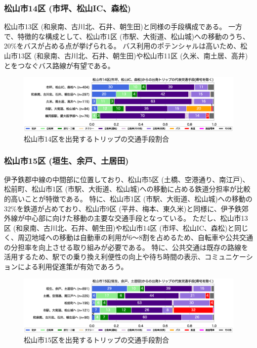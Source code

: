 \documentclass[a4paper,12pt, uplatex]{jsbook}
\begin{document}
\subsubsection{松山市14区 (市坪、松山IC、森松)}
松山市13区 (和泉南、古川北、石井、朝生田)と同様の手段構成である。
一方で、特徴的な構成として、松山市1区 (市駅、大街道、松山城)への移動のうち、20\%をバスが占める点が挙げられる。
バス利用のポテンシャルは高いため、松山市13区 (和泉南、古川北、石井、朝生田)や松山市11区 (久米、南土居、高井)とをつなぐバス路線が有望である。
%
\begin{figure}[H]
    \centering
    \includegraphics[width=1.0\textwidth]{picture/mode_share_松山市14区.eps}
    \caption{松山市14区を出発するトリップの交通手段割合}
    \label{fig:mode_share_14}
\end{figure}

\subsubsection{松山市15区 (垣生、余戸、土居田)}
伊予鉄郡中線の中間部に位置しており、松山市5区 (土橋、空港通り、南江戸)、松前町、松山市1区 (市駅、大街道、松山城)への移動に占める鉄道分担率が比較的高いことが特徴である。
特に、松山市1区 (市駅、大街道、松山城)への移動の32\%を鉄道が占めており、松山市9区 (平井、梅本、東久米)と同様に、伊予鉄郊外線が中心部に向けた移動の主要な交通手段となっている。
ただし、松山市13区 (和泉南、古川北、石井、朝生田)や松山市14区 (市坪、松山IC、森松)と同じく、周辺地域への移動は自動車の利用が6〜8割を占めるため、自転車や公共交通の分担率を向上させる取り組みが必要である。
特に、公共交通は既存の路線を活用するため、駅での乗り換え利便性の向上や待ち時間の表示、コミュニケーションによる利用促進策が有効であろう。
%
\begin{figure}[H]
    \centering
    \includegraphics[width=1.0\textwidth]{picture/mode_share_松山市15区.eps}
    \caption{松山市15区を出発するトリップの交通手段割合}
    \label{fig:mode_share_15}
\end{figure}
\end{document}
